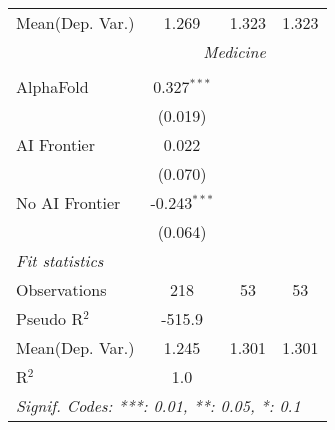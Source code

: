 \begin{tabular}{lccc}
Mean(Dep. Var.) & 1.269 & 1.323 & 1.323 \\
 & \multicolumn{3}{c}{\textit{Medicine}} \\ \\
   AlphaFold      & 0.327$^{***}$  &     &   \\   
                  & (0.019)        &     &   \\   
   AI Frontier    & 0.022          &     &   \\   
                  & (0.070)        &     &   \\   
   No AI Frontier & -0.243$^{***}$ &     &   \\   
                  & (0.064)        &     &   \\   
   \midrule
   \emph{Fit statistics}\\
   Observations   & 218            & 53  & 53\\  
   Pseudo R$^2$   & -515.9         &     & \\  
Mean(Dep. Var.) & 1.245 & 1.301 & 1.301 \\
   R$^2$          & 1.0            &     & \\  
   \midrule \midrule
   \multicolumn{4}{l}{\emph{Signif. Codes: ***: 0.01, **: 0.05, *: 0.1}}\\
\end{tabular}
\par\endgroup
